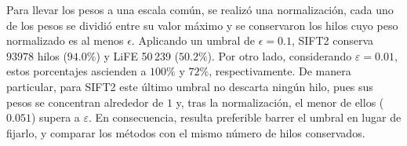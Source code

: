\documentclass[11pt,a4paper]{article}
\newcommand{\eps}{\varepsilon}
\begin{document}
Para llevar los pesos a una escala común, se realizó una  normalización, cada uno de los pesos se dividió entre su valor máximo y se conservaron los hilos cuyo peso normalizado es al menos $\epsilon$. Aplicando un umbral de $\epsilon=0.1$,  SIFT2 conserva $93978$ hilos ($94.0\%$) y LiFE 50\,239 ($50.2\%$). Por otro lado, considerando  $\eps=0.01$, estos porcentajes ascienden a $100\%$ y $72\%$, respectivamente. De manera particular, para SIFT2 este último umbral no descarta ningún hilo, pues sus pesos se concentran alrededor de $1$ y, tras la normalización, el menor de ellos ($0.051$) supera a $\eps$. En consecuencia, resulta preferible barrer el umbral en lugar de fijarlo, y comparar los métodos con el mismo número de hilos conservados.

\end{document}
